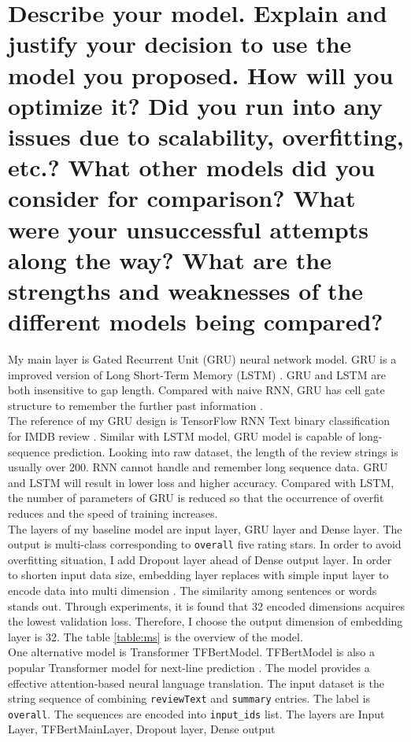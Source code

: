 \documentclass[12pt]{article}
\begin{document}
\section{Describe your model. Explain and justify your decision to use the model you proposed. How
will you optimize it? Did you run into any issues due to scalability, overfitting, etc.? What
other models did you consider for comparison? What were your unsuccessful attempts along
the way? What are the strengths and weaknesses of the different models being compared?} 
My main layer is Gated Recurrent Unit (GRU) neural network model.
GRU is a improved version of Long Short-Term Memory (LSTM) \cite{gru}. GRU and LSTM are both insensitive 
to gap length. Compared with naive RNN, GRU has cell gate structure to remember the further past information \cite{lstm}.\\
The reference of my GRU design is
TensorFlow RNN Text binary classification for IMDB review \cite{Textclassification}. Similar with LSTM model, GRU
model is capable of long-sequence prediction. Looking into raw dataset, the length of the review strings
is usually over 200. RNN cannot handle and remember long sequence data. GRU and LSTM will result in lower loss and 
higher accuracy.
Compared with LSTM, the number of parameters of GRU is reduced so
that the occurrence of overfit reduces and the speed of training increases.\\
The layers of my baseline model are input layer, GRU layer and Dense layer. The output is multi-class corresponding to \texttt{overall} five rating stars. In order to avoid overfitting situation, I add Dropout layer ahead of Dense output layer. In order to shorten input data size, embedding layer replaces with simple input layer to encode data into
multi dimension \cite{emd}. The similarity among sentences or words stands out. Through experiments,
it is found that 32 encoded dimensions acquires the lowest validation loss. Therefore, I choose the output
dimension of embedding layer is 32. The table \ref{table:ms} is the overview of the model.\\
One alternative model is Transformer TFBertModel.
TFBertModel is also a popular Transformer model for next-line prediction \cite{BERT, trans}. 
The model provides a effective attention-based neural language translation.
The input dataset is the string
sequence of combining \texttt{reviewText} and \texttt{summary} entries. The label is \texttt{overall}. The sequences are
encoded into \texttt{input\_ids} list. The layers are Input Layer, TFBertMainLayer, Dropout layer, Dense output
\end{document}

